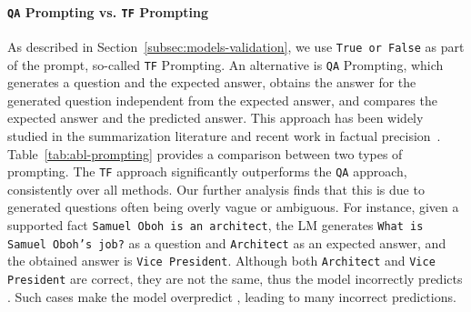 \paragraph{\texttt{QA} Prompting vs. \texttt{TF} Prompting}
As described in Section~\ref{subsec:models-validation}, we use \texttt{True or False} as part of the prompt, so-called \texttt{TF} Prompting. An alternative is \texttt{QA} Prompting, which generates a question and the expected answer, obtains the answer for the generated question independent from the expected answer, and compares the expected answer and the predicted answer. This approach has been widely studied in the summarization literature and recent work in factual precision~\citep{kryscinski2019evaluating,wang2020asking,gao2022attributed,manakul2023selfcheckgpt}.
Table~\ref{tab:abl-prompting} provides a comparison between two types of prompting.
The \texttt{TF} approach significantly outperforms the \texttt{QA} approach, consistently over all methods. Our further analysis finds that this is due to generated questions often being overly vague or ambiguous. For instance, given a supported fact \texttt{Samuel Oboh is an architect}, the LM generates \texttt{What is Samuel Oboh's job?} as a question and \texttt{Architect} as an expected answer, and the obtained answer is \texttt{Vice President}. Although both \texttt{Architect} and \texttt{Vice President} are correct, they are not the same, thus the model incorrectly predicts \nsLabel.
Such cases make the model overpredict \nsLabel, leading to many incorrect predictions.

